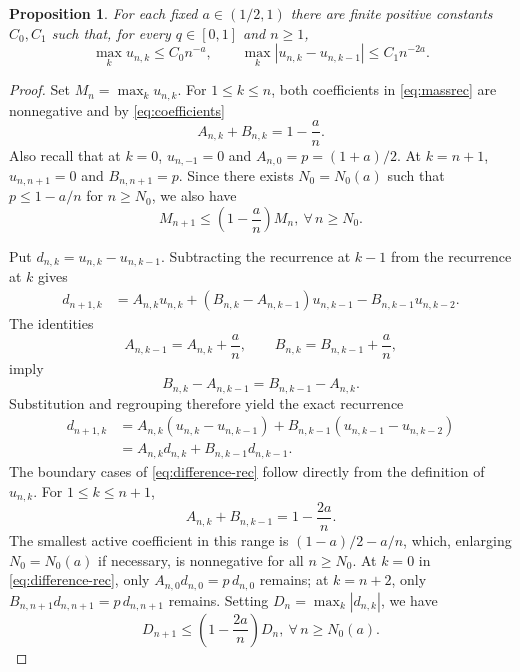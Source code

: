 \documentclass[11pt]{article}
\numberwithin{equation}{section}
\newtheorem{proposition}[theorem]{Proposition}
\theoremstyle{remark}
\begin{document}
\smallskip

\begin{proposition}\label{prop:lattice}
For each fixed $a\in(1/2,1)$ there are finite positive constants $C_0,C_1$ such that,
for every $q\in[0,1]$ and $n\geq1$,
\begin{equation}\label{eq:lattice-bounds}
 \max_k u_{n,k}\leq C_0n^{-a},
 \qquad
 \max_k|u_{n,k}-u_{n,k-1}|\leq C_1n^{-2a}.
\end{equation}
\end{proposition}

\begin{proof}
Set $M_n=\max_k u_{n,k}$. For $1\leq k\leq n$, both coefficients in
\eqref{eq:massrec} are nonnegative and by \eqref{eq:coefficients}
\[
 A_{n,k}+B_{n,k}=1-\frac an.
\]
Also recall that at $k=0$, $u_{n,-1}=0$ and $A_{n,0}=p=(1+a)/2$. At $k=n+1$,
$u_{n,n+1}=0$ and $B_{n,n+1}=p$. Since there exists $N_0 = N_0(a)$ such that $p \le 1- a/n$ for $n\ge N_0$, we also have 
\begin{equation}\label{eq:mass-contraction}
 M_{n+1}\leq\left(1-\frac an\right)M_n, \ \forall \, n\ge N_0.
\end{equation}

Put $d_{n,k}=u_{n,k}-u_{n,k-1}$. Subtracting the recurrence at $k-1$ from
the recurrence at $k$ gives
\begin{align*}
 d_{n+1,k}
 &=A_{n,k}u_{n,k}+(B_{n,k}-A_{n,k-1})u_{n,k-1}
   -B_{n,k-1}u_{n,k-2}.
\end{align*}
The identities
\[
 A_{n,k-1}=A_{n,k}+\frac an,
 \qquad B_{n,k}=B_{n,k-1}+\frac an,
\]
imply
\[
 B_{n,k}-A_{n,k-1}=B_{n,k-1}-A_{n,k}.
\]
Substitution and regrouping therefore yield the exact recurrence
\begin{equation}\label{eq:difference-rec}
 \begin{aligned}
 d_{n+1,k}
 &=A_{n,k}(u_{n,k}-u_{n,k-1})
   +B_{n,k-1}(u_{n,k-1}-u_{n,k-2})\\
 &=A_{n,k}d_{n,k}+B_{n,k-1}d_{n,k-1}.
 \end{aligned}
\end{equation}
The boundary cases of \eqref{eq:difference-rec} follow directly from the
definition of $u_{n,k}$. For
$1\leq k\leq n+1$,
\[
 A_{n,k}+B_{n,k-1}=1-\frac{2a}{n}.
\]
The smallest active coefficient in this range is
$(1-a)/2-a/n$, which, enlarging $N_0 = N_0(a)$ if necessary, is nonnegative for all $n \ge N_0$. At $k=0$ in \eqref{eq:difference-rec}, only
$A_{n,0}d_{n,0}=p\,d_{n,0}$ remains; at
$k=n+2$, only
$B_{n,n+1}d_{n,n+1}=p\,d_{n,n+1}$ remains. Setting $D_n=\max_k|d_{n,k}|$, we have
\begin{equation}\label{eq:difference-contraction}
 D_{n+1}\leq\left(1-\frac{2a}{n}\right)D_n , \ \forall \, n\ge N_0(a).
\end{equation}


\end{proof}
\end{document}
